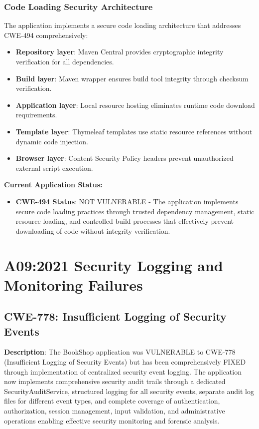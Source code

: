 \documentclass[]{UCD_CS_FYP_Report}
\begin{document}
\subsection{Code Loading Security Architecture}
The application implements a secure code loading architecture that addresses CWE-494 comprehensively:
\begin{itemize}
	\item \textbf{Repository layer}: Maven Central provides cryptographic integrity verification for all dependencies.
	\item \textbf{Build layer}: Maven wrapper ensures build tool integrity through checksum verification.
	\item \textbf{Application layer}: Local resource hosting eliminates runtime code download requirements.
	\item \textbf{Template layer}: Thymeleaf templates use static resource references without dynamic code injection.
	\item \textbf{Browser layer}: Content Security Policy headers prevent unauthorized external script execution.
\end{itemize}

\textbf{Current Application Status:}
\begin{itemize}
	\item \textbf{CWE-494 Status}: NOT VULNERABLE - The application implements secure code loading practices through trusted dependency management, static resource loading, and controlled build processes that effectively prevent downloading of code without integrity verification.
\end{itemize}

\chapter{A09:2021 Security Logging and Monitoring Failures}

\section{CWE-778: Insufficient Logging of Security Events}

\textbf{Description}: The BookShop application was VULNERABLE to CWE-778 (Insufficient Logging of Security Events) but has been comprehensively FIXED through implementation of centralized security event logging. The application now implements comprehensive security audit trails through a dedicated SecurityAuditService, structured logging for all security events, separate audit log files for different event types, and complete coverage of authentication, authorization, session management, input validation, and administrative operations enabling effective security monitoring and forensic analysis.
\end{document}
